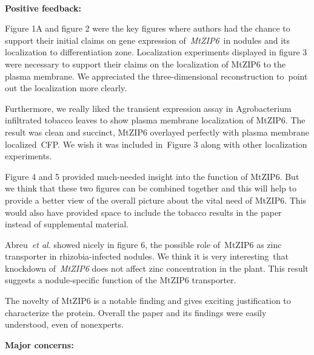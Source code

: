\documentclass[10pt]{article}
\begin{document}
~

\textbf{Positive feedback:}

\par\null

Figure 1A and figure 2 were the key figures where authors had the chance
to support their initial claims on gene expression of~\emph{MtZIP6}~in
nodules and its localization to differentiation zone. Localization
experiments displayed in figure 3 were necessary to support their claims
on the localization of MtZIP6 to the plasma membrane. We appreciated the
three-dimensional reconstruction to~point out the localization more
clearly.~

\par\null

Furthermore, we really liked the transient expression assay in
Agrobacterium infiltrated tobacco leaves to show plasma membrane
localization of MtZIP6. The result was clean and succinct, MtZIP6
overlayed perfectly with plasma membrane localized~CFP. We wish it was
included in~Figure 3 along with other localization experiments.

\par\null

Figure 4 and 5 provided much-needed insight into the function of MtZIP6.
But we think that these two figures can be combined together and this
will help to provide a better view of the overall picture about the
vital need of MtZIP6. This would also have provided space to include the
tobacco results in the paper instead of supplemental material.~

\par\null

Abreu~\emph{et al.} showed nicely in figure 6, the possible role
of~MtZIP6 as zinc transporter in rhizobia-infected nodules. We think it
is very interesting~that knockdown of~\emph{MtZIP6} does not affect zinc
concentration in the plant. This result suggests a nodule-specific
function of the MtZIP6 transporter.~

\par\null

The novelty of MtZIP6 is a notable finding and gives exciting
justification to characterize the protein. Overall the paper and its
findings were easily understood, even of nonexperts.~

\par\null

\textbf{Major concerns:}

\par\null
\end{document}
